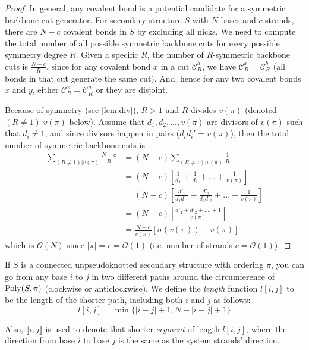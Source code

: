 \begin{proof}
	In general, any covalent bond is a potential candidate for a symmetric backbone cut generator. For secondary structure $S$ with $N$ bases and $c$ strands, there are $N-c$ covalent bonds  in $S$ by excluding all nicks.  
	We need to compute the total number of all possible  symmetric backbone cuts for every possible symmetry degree $R$. 
	Given a specific $R$, the number of    $R$-symmetric backbone cuts is $\frac{N-c}{R}$, 
	since for any covalent bond $x$ in a cut $\mathcal{C}_R^b$, we have $\mathcal{C}_R^x = \mathcal{C}_R^b$ (all bonds in that cut generate the same cut). 
	And, hence for any two covalent bonds $x$ and $y$, either $\mathcal{C}_R^x = \mathcal{C}_R^y$ or they are disjoint.   
	
	Because of symmetry (see \cref{lem:div}),  $R>1$ and $R$ divides $v(\pi)$ (denoted $(R\neq1)|v(\pi)$ below). 
	Assume that $d_1, d_2, ..., v(\pi)$ are divisors of $v(\pi)$ such that $d_i \neq 1$, 
	and since divisors happen in pairs ($d_i d_i' = v(\pi)$), 
	then the total number of symmetric backbone cuts is 	\begin{align*}
		\sum\limits_{(R\neq1)|v(\pi)}\frac{N-c}{R} &= 
		(N-c) \sum\limits_{(R\neq1)|v(\pi)}\frac{1}{R} \\
		&= (N-c) \left[ \frac{1}{d_1} + \frac{1}{d_2} + ... + \frac{1}{v(\pi)} \right] 
		\\
		&= (N-c) \left[ \frac{d'_1}{d_1d'_1} + \frac{d'_2}{d_2d'_2} + ... + \frac{1}{v(\pi)} \right] \\
		&= (N-c) \left[ \frac{d'_1 + d'_2 + .... + 1}{v(\pi)}\right]
		\\ 
		&=\frac{N-c}{v(\pi)} \left[ \sigma(v(\pi))-v(\pi) \right]
	\end{align*}
	which is $\mathcal{O}(N)$ since $|\pi|=c=\mathcal{O}(1)$ (i.e. number of strands $c=\mathcal{O}(1)$).
\end{proof}


If $S$ is a connected unpseudoknotted secondary structure with ordering $\pi$, you can go from any base $i$ to $j$ in two different paths around the circumference of $\mathrm{Poly}(S,\pi)$ (clockwise or anticlockwise). We define the \emph{length} function $l[i,j]$ to be the length of the shorter path, including both $i$ and $j$ as follows: 
\begin{equation}
	l[i,j] = \min \{|i-j|+1,N-|i-j|+1\}
\end{equation} 

Also,  $\llbracket i,j \rrbracket$  is used to denote that shorter {\em segment} of length $l[i,j]$, where the direction from base $i$ to base $j$ is the same as the system strands' direction.    

